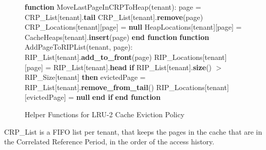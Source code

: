 \begin{figure}[htbp]
    \centering
    \begin{minipage}{\linewidth}
    \begin{algorithm}[H]
        \begin{algorithmic}
            \STATE \textbf{function} MoveLastPageInCRPToHeap(tenant):
            \STATE \hspace{\algorithmicindent} page = CRP\_List[tenant].\textbf{tail}
            \STATE \hspace{\algorithmicindent} CRP\_List[tenant].\textbf{remove}(page)
            \STATE \hspace{\algorithmicindent} CRP\_Locations[tenant][page] = \textbf{null}
            \STATE \hspace{\algorithmicindent} HeapLocations[tenant][page] = CacheHeaps[tenant].\textbf{insert}(page)
            \STATE \textbf{end function}
            \STATE
            \STATE \textbf{function} AddPageToRIPList(tenant, page):
            \STATE \hspace{\algorithmicindent} RIP\_List[tenant].\textbf{add\_to\_front}(page)
            \STATE \hspace{\algorithmicindent} RIP\_Locations[tenant][page] = RIP\_List[tenant].\textbf{head}
            \STATE \hspace{\algorithmicindent} \textbf{if} RIP\_List[tenant].\textbf{size}() $>$ RIP\_Size[tenant] \textbf{then}
            \STATE \hspace{\algorithmicindent} \hspace{\algorithmicindent} evictedPage = RIP\_List[tenant].\textbf{remove\_from\_tail}()
            \STATE \hspace{\algorithmicindent} \hspace{\algorithmicindent} RIP\_Locations[tenant][evictedPage] = \textbf{null}
            \STATE \hspace{\algorithmicindent} \textbf{end if}
            \STATE \textbf{end function}
        \end{algorithmic}
    \end{algorithm}
    \caption{Helper Functions for LRU-2 Cache Eviction Policy}
    \label{fig:lru-2-helper}
    \end{minipage}
\end{figure}

CRP\_List is a FIFO list per tenant, that keeps the pages in the cache that are in the
Correlated Reference Period, in the order of the access history.

